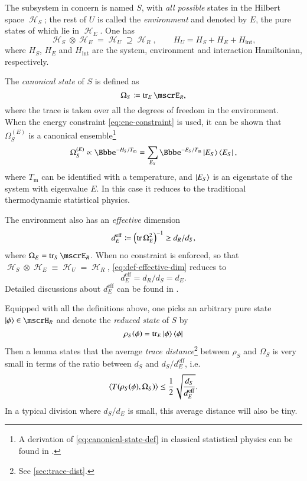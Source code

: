 The subsystem in concern is named $S$, with \emph{all possible} states in the
Hilbert space $\mscrH_S$; the rest of $U$ is called the \emph{environment} and 
denoted by $E$, the pure states of which lie in $\mscrH_E$. One has
\begin{equation}
\mscrH_S \otimes \mscrH_E = \mscrH_U \supseteq \mscrH_R,\qquad
H_U = H_S + H_E + H_\text{int},
\end{equation}
where $H_S$, $H_E$ and $H_\text{int}$ are the system, environment and 
interaction Hamiltonian, respectively. 

The \emph{canonical state} of $S$ is defined as
\begin{equation}
{\Omega}_S \coloneqq \tr_E {\mscrE}_R,
\end{equation}
where the trace is taken over all the degrees of freedom in the environment. 
When the energy constraint \cref{eq:ene-constraint} is used, it can be shown 
that $\Omega_S^{(E)}$ is a canonical ensemble\footnote{A derivation of 
\cref{eq:canonical-state-def} in classical statistical physics can be found in 
\cite[sec.~28]{Landau1980}.}
\begin{equation}
\Omega_S^{(E)} \propto \ee^{- H_S/T_\text{m}}
= \sum_{E_S} \ee^{-E_S/T_\text{m}} \Ket{E_S}\Bra{E_S},
\label{eq:canonical-state-def}
\end{equation}
where $T_\text{m}$ can be identified with a temperature, and $\Ket{E_S}$ is an
eigenstate of the system with eigenvalue $E$. In this case it reduces to 
the traditional thermodynamic statistical physics.

The environment also has an \emph{effective} dimension
\begin{equation}
d_E^\text{eff} \coloneqq {\left(\operatorname{tr}\Omega_E^2\right)}^{-1} \geq d_R/d_S,
\label{eq:def-effective-dim}
\end{equation}
where ${\Omega}_E = \tr_S {\mscrE}_R$. When no constraint is enforced, so that
$\mscrH_S \otimes \mscrH_E \equiv \mscrH_U = \mscrH_R$, 
\cref{eq:def-effective-dim} reduces to
\begin{equation}
d_E^\text{eff} = d_R/d_S = d_E.
\end{equation}
Detailed discussions about $d_E^\text{eff}$ can be found in \cite{Popescu2006}.

Equipped with all the definitions above, one picks an arbitrary pure state 
$\Ket{\phi}\in\mscrH_R$ and denote the \emph{reduced state} of $S$ by
\begin{equation}
{\rho_S}\mathopen{}\left(\phi\right)\mathclose{} = \operatorname{tr}_E \Ket{\phi}\Bra{\phi}
\end{equation}
Then a lemma states that the average \emph{trace distance}\footnote{See 
\cref{sec:trace-dist}.} between $\rho_S$ and $\Omega_S$ is very small in terms 
of the ratio between $d_S$ and $d_S/d_E^\text{eff}$, i.e.\
\begin{equation}
{\left<{T}\mathopen{}\left({\rho_S}\mathopen{}\left(\phi\right)\mathclose{}, {\Omega}_S\right)\mathclose{}\right>} \le \frac{1}{2}
\sqrt{\frac{d_S}{d_E^\text{eff}}}.
\end{equation}
In a typical division where $d_S/d_E$ is small, this average distance will also 
be tiny.

